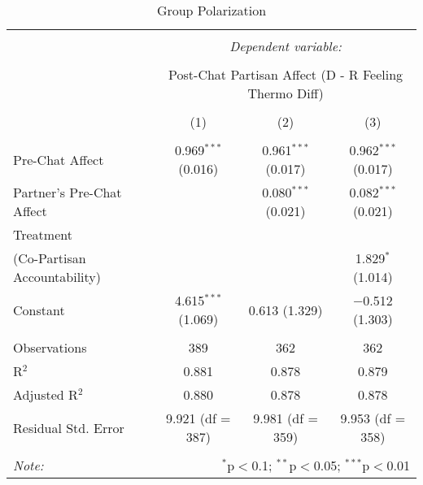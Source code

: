 
\begin{table}[H] \centering 
  \caption{Group Polarization} 
  \label{tab:s2_group_polarization_main} 
\begin{tabular}{@{\extracolsep{5pt}}lccc} 
\\[-1.8ex]\hline 
\hline \\[-1.8ex] 
 & \multicolumn{3}{c}{\textit{Dependent variable:}} \\ 
\cline{2-4} 
\\[-1.8ex] & \multicolumn{3}{c}{Post-Chat Partisan Affect (D - R Feeling Thermo Diff)} \\ 
\\[-1.8ex] & (1) & (2) & (3)\\ 
\hline \\[-1.8ex] 
 Pre-Chat Affect & 0.969$^{***}$ (0.016) & 0.961$^{***}$ (0.017) & 0.962$^{***}$ (0.017) \\ 
  Partner's Pre-Chat Affect &  & 0.080$^{***}$ (0.021) & 0.082$^{***}$ (0.021) \\ 
  Treatment\\(Co-Partisan Accountability) &  &  & 1.829$^{*}$ (1.014) \\ 
  Constant & 4.615$^{***}$ (1.069) & 0.613 (1.329) & $-$0.512 (1.303) \\ 
 \hline \\[-1.8ex] 
Observations & 389 & 362 & 362 \\ 
R$^{2}$ & 0.881 & 0.878 & 0.879 \\ 
Adjusted R$^{2}$ & 0.880 & 0.878 & 0.878 \\ 
Residual Std. Error & 9.921 (df = 387) & 9.981 (df = 359) & 9.953 (df = 358) \\ 
\hline 
\hline \\[-1.8ex] 
\textit{Note:}  & \multicolumn{3}{r}{$^{*}$p$<$0.1; $^{**}$p$<$0.05; $^{***}$p$<$0.01} \\ 
\end{tabular} 
\end{table} 
